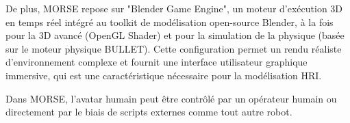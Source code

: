 \documentclass[a4paper,11pt,twoside]{StyleThese}
\begin{document}
De plus, MORSE repose sur "Blender Game Engine",
un moteur d'exécution 3D en temps réel intégré au toolkit de modélisation open-source Blender, à la fois pour la 3D avancé (OpenGL Shader) et
pour la simulation de la physique (basée sur le moteur physique BULLET).
Cette configuration permet un rendu réaliste d'environnement complexe et fournit une interface utilisateur graphique immersive, qui est une caractéristique nécessaire %
pour la modélisation HRI.

Dans MORSE, l'avatar humain peut être contrôlé par un opérateur humain ou directement par le biais de scripts externes comme tout autre robot.



\end{document}

